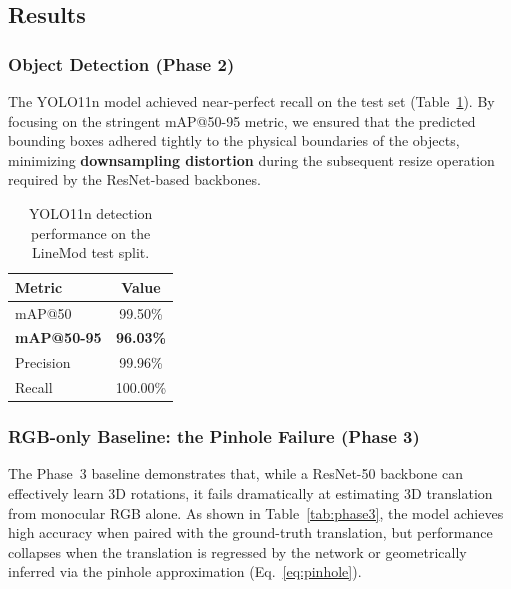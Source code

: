 \subsection{Results}
\label{sec:exp_results}

\subsubsection{Object Detection (Phase 2)}
The YOLO11n model achieved near-perfect recall on the test set (Table~\ref{tab:yolo}). By focusing on the stringent mAP@50-95 metric, we ensured that the predicted bounding boxes adhered tightly to the physical boundaries of the objects, minimizing \textbf{downsampling distortion} during the subsequent resize operation required by the ResNet-based backbones.

\begin{table}[t]
\centering
\caption{YOLO11n detection performance on the LineMod test split.}
\label{tab:yolo}
\small
\begin{tabular}{@{}lc@{}}
\toprule
Metric & Value \\
\midrule
mAP@50          & 99.50\% \\
\textbf{mAP@50-95} & \textbf{96.03\%} \\
Precision       & 99.96\% \\
Recall          & 100.00\% \\
\bottomrule
\end{tabular}
\end{table}

\subsubsection{RGB-only Baseline: the Pinhole Failure (Phase 3)}
The Phase~3 baseline demonstrates that, while a ResNet-50 backbone can effectively learn 3D rotations, it fails dramatically at estimating 3D translation from monocular RGB alone. As shown in Table~\ref{tab:phase3}, the model achieves high accuracy when paired with the ground-truth translation, but performance collapses when the translation is regressed by the network or geometrically inferred via the pinhole approximation (Eq.~\ref{eq:pinhole}).

\begin{table}[t]
\centering
\caption{Phase~3 baseline accuracy (ADD/ADD-S $<$ 10\% of object diameter).}
\label{tab:phase3}
\small
{}
\end{table}

